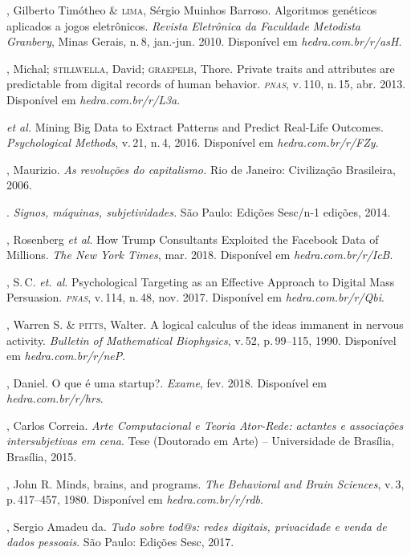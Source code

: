 \begin{bibliohedra}
, Gilberto Timótheo \& \textsc{lima}, Sérgio Muinhos Barroso.
Algoritmos genéticos aplicados a jogos eletrônicos. \textit{Revista
Eletrônica da Faculdade Metodista Granbery}, Minas Gerais, n.\,8, jan.-jun. 2010. Disponível em \textit{hedra.com.br/r/asH}.

, Michal; \textsc{stillwella}, David; \textsc{graepelb}, Thore.
Private traits and attributes are predictable from digital
records of human behavior. \textit{\textsc{pnas}}, v.\,110, n.\,15, abr. 2013.
Disponível em \textit{hedra.com.br/r/L3a}.

\titidem\mbox{} \textit{et al.} Mining Big Data to Extract Patterns and Predict Real-Life
Outcomes. \textit{Psychological Methods}, v.\,21, n.\,4, 2016. Disponível em \textit{hedra.com.br/r/FZy}.

, Maurizio. \textit{As revoluções do capitalismo.} Rio de
Janeiro: Civilização Brasileira, 2006.

\titidem. \textit{Signos, máquinas, subjetividades.} São
Paulo: Edições Sesc/n-1 edições, 2014.

, Rosenberg \textit{et al}. How Trump Consultants Exploited the
Facebook Data of Millions. \textit{The New York Times}, mar. 2018. Disponível em \textit{hedra.com.br/r/IcB}.

, S.\,C. \textit{et. al}.
Psychological Targeting as an Effective Approach to Digital Mass
Persuasion. \textit{\textsc{pnas}}, v.\,114, n.\,48, nov. 2017. Disponível em \textit{hedra.com.br/r/Qbi}.

, Warren S. \& \textsc{pitts}, Walter. A logical calculus of the
ideas immanent in nervous activity. \textit{Bulletin of Mathematical
Biophysics}, v.\,52, p.\,99--115, 1990. Disponível em \textit{hedra.com.br/r/neP}.

, Daniel. O que é uma startup?. \textit{Exame}, fev. 2018. Disponível em \textit{hedra.com.br/r/hrs}.

, Carlos Correia. \textit{Arte Computacional e Teoria Ator-Rede:
actantes e associações intersubjetivas em cena}. Tese (Doutorado em Arte) --
Universidade de Brasília, Brasília, 2015.

, John R. Minds, brains, and programs. \textit{The Behavioral and
Brain Sciences}, v.\,3, p.\,417--457, 1980.
Disponível em \textit{hedra.com.br/r/rdb}.

, Sergio Amadeu da. \textit{Tudo sobre tod@s: redes digitais,
privacidade e venda de dados pessoais}. São Paulo: Edições Sesc, 2017.


\end{bibliohedra}

